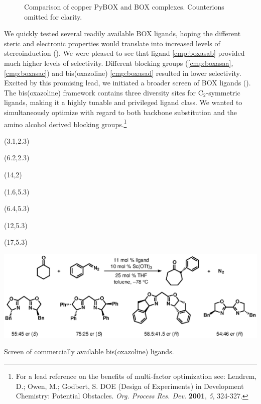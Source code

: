 \begin{figure}[t]
  \vspace{0.6in}
  \caption{Comparison of copper PyBOX and BOX complexes. Counterions omitted for clarity.}
  \label{fig:ascoppercomplexes}
\end{figure}  


We quickly tested several readily available BOX ligands, hoping the different steric
and electronic properties would translate into increased levels of stereoinduction
().
We were pleased to see that ligand \ref{cmp:boxasab} provided much higher levels of selectivity. Different blocking
groups (\ref{cmp:boxasaa}, \ref{cmp:boxasac}) and bis(oxazoline) \ref{cmp:boxasad} resulted in
lower selectivity. Excited by this promising lead, we initiated a broader screen of BOX ligands
(). The bis(oxazoline) framework contains three diversity sites for
C$_2$-symmetric ligands, making it a highly tunable and privileged ligand
class. We wanted to simultaneously optimize with regard to both backbone substitution and the amino alcohol derived blocking groups.\footnote{For a lead reference on the
benefits of multi-factor optimization see: {\frenchspacing Lendrem, D.; Owen, M.; Godbert,
S. DOE (Design of Experiments) in Development Chemistry: Potential Obstacles. \textit{Org. Process
Res. Dev.} \textbf{2001}, \textit{5}, 324-327.}}
 \begin{Scheme}[t]
  \centering
   \begin{textblock}{1}(3.1,2.3)  \end{textblock}
   \begin{textblock}{1}(6.2,2.3)  \end{textblock}
   \begin{textblock}{1}(14,2)  \end{textblock}
   \begin{textblock}{1}(1.6,5.3)  \end{textblock}
    \begin{textblock}{1}(6.4,5.3)  \end{textblock}
     \begin{textblock}{1}(12,5.3)  \end{textblock}
      \begin{textblock}{1}(17,5.3)  \end{textblock}
  \includegraphics[scale=0.8]{chp_asymmetric/images/firstboxscreen}
  \caption{Screen of commercially available bis(oxazoline) ligands.}
  \label{sch:asfirstboxscreen}
\end{Scheme}

